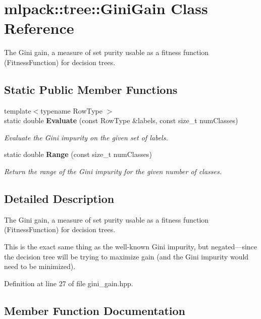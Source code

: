 \section{mlpack\+:\+:tree\+:\+:Gini\+Gain Class Reference}
\label{classmlpack_1_1tree_1_1GiniGain}


The Gini gain, a measure of set purity usable as a fitness function (Fitness\+Function) for decision trees.  


\subsection*{Static Public Member Functions}
\begin{DoxyCompactItemize}
\item 
{\footnotesize template$<$typename Row\+Type $>$ }\\static double {\bf Evaluate} (const Row\+Type \&labels, const size\+\_\+t num\+Classes)
\begin{DoxyCompactList}\small\item\em Evaluate the Gini impurity on the given set of labels. \end{DoxyCompactList}\item 
static double {\bf Range} (const size\+\_\+t num\+Classes)
\begin{DoxyCompactList}\small\item\em Return the range of the Gini impurity for the given number of classes. \end{DoxyCompactList}\end{DoxyCompactItemize}


\subsection{Detailed Description}
The Gini gain, a measure of set purity usable as a fitness function (Fitness\+Function) for decision trees. 

This is the exact same thing as the well-\/known Gini impurity, but negated---since the decision tree will be trying to maximize gain (and the Gini impurity would need to be minimized). 

Definition at line 27 of file gini\+\_\+gain.\+hpp.



\subsection{Member Function Documentation}
